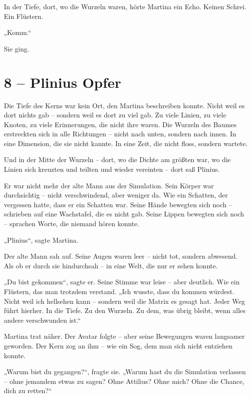 \documentclass[
]{article}
\begin{document}
In der Tiefe, dort, wo die Wurzeln waren, hörte Martina ein Echo. Keinen Schrei. Ein Flüstern.

„Komm.``

Sie ging.

\section{8 -- Plinius\textquotesingle{} Opfer}\label{plinius-opfer}

Die Tiefe des Kerns war kein Ort, den Martina beschreiben konnte. Nicht weil es dort nichts gab -- sondern weil es dort zu viel gab. Zu viele Linien, zu viele Knoten, zu viele Erinnerungen, die nicht ihre waren. Die Wurzeln des Baumes erstreckten sich in alle Richtungen -- nicht nach unten, sondern nach innen. In eine Dimension, die sie nicht kannte. In eine Zeit, die nicht floss, sondern wartete.

Und in der Mitte der Wurzeln -- dort, wo die Dichte am größten war, wo die Linien sich kreuzten und teilten und wieder vereinten -- dort saß Plinius.

Er war nicht mehr der alte Mann aus der Simulation. Sein Körper war durchsichtig -- nicht verschwindend, aber weniger da. Wie ein Schatten, der vergessen hatte, dass er ein Schatten war. Seine Hände bewegten sich noch -- schrieben auf eine Wachstafel, die es nicht gab. Seine Lippen bewegten sich noch -- sprachen Worte, die niemand hören konnte.

„Plinius``, sagte Martina.

Der alte Mann sah auf. Seine Augen waren leer -- nicht tot, sondern abwesend. Als ob er durch sie hindurchsah -- in eine Welt, die nur er sehen konnte.

„Du bist gekommen``, sagte er. Seine Stimme war leise -- aber deutlich. Wie ein Flüstern, das man trotzdem verstand. „Ich wusste, dass du kommen würdest. Nicht weil ich hellsehen kann -- sondern weil die Matrix es gesagt hat. Jeder Weg führt hierher. In die Tiefe. Zu den Wurzeln. Zu dem, was übrig bleibt, wenn alles andere verschwunden ist.``

Martina trat näher. Der Avatar folgte -- aber seine Bewegungen waren langsamer geworden. Der Kern zog an ihm -- wie ein Sog, dem man sich nicht entziehen konnte.

„Warum bist du gegangen?{\kern0pt}``, fragte sie. „Warum hast du die Simulation verlassen -- ohne jemandem etwas zu sagen? Ohne Attilius? Ohne mich? Ohne die Chance, dich zu retten?{\kern0pt}``
\end{document}
